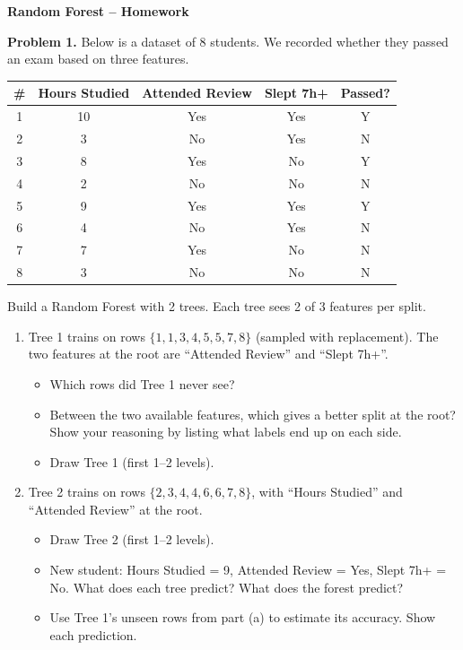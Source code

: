 \documentclass[11pt,a4paper]{article}
\begin{document}
\begin{center}
{\Large\bfseries Random Forest -- Homework}
\end{center}

\bigskip

\textbf{Problem 1.}
Below is a dataset of 8 students. We recorded whether they passed an exam based on three features.

\begin{center}
\begin{tabular}{c|ccc|c}
\# & Hours Studied & Attended Review & Slept 7h+ & Passed? \\
\hline
1 & 10 & Yes & Yes & Y \\
2 & 3  & No  & Yes & N \\
3 & 8  & Yes & No  & Y \\
4 & 2  & No  & No  & N \\
5 & 9  & Yes & Yes & Y \\
6 & 4  & No  & Yes & N \\
7 & 7  & Yes & No  & N \\
8 & 3  & No  & No  & N \\
\end{tabular}
\end{center}

Build a Random Forest with 2 trees. Each tree sees 2 of 3 features per split.

\begin{enumerate}[label=(\alph*)]
\item Tree 1 trains on rows $\{1, 1, 3, 4, 5, 5, 7, 8\}$ (sampled with replacement). The two features at the root are ``Attended Review'' and ``Slept 7h+''.

\begin{itemize}
  \item Which rows did Tree 1 never see?
  \item Between the two available features, which gives a better split at the root? Show your reasoning by listing what labels end up on each side.
  \item Draw Tree 1 (first 1--2 levels).
\end{itemize}

\item Tree 2 trains on rows $\{2, 3, 4, 4, 6, 6, 7, 8\}$, with ``Hours Studied'' and ``Attended Review'' at the root.

\begin{itemize}
  \item Draw Tree 2 (first 1--2 levels).
  \item New student: Hours Studied = 9, Attended Review = Yes, Slept 7h+ = No. What does each tree predict? What does the forest predict?
  \item Use Tree 1's unseen rows from part (a) to estimate its accuracy. Show each prediction.
\end{itemize}
\end{enumerate}
\end{document}
